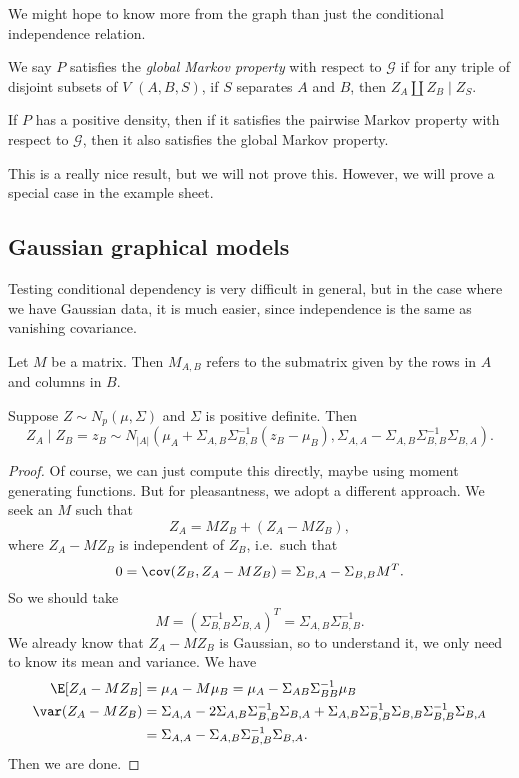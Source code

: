 \documentclass[a4paper]{article}
\begin{document}
We might hope to know more from the graph than just the conditional independence relation.

\begin{defi}
  We say $P$ satisfies the \emph{global Markov property} with respect to $\mathcal{G}$ if for any triple of disjoint subsets of $V$ $(A, B, S)$, if $S$ separates $A$ and $B$, then $Z_A \amalg Z_B \mid Z_S$.
\end{defi}

\begin{prop}
  If $P$ has a positive density, then if it satisfies the pairwise Markov property with respect to $\mathcal{G}$, then it also satisfies the global Markov property.
\end{prop}
This is a really nice result, but we will not prove this. However, we will prove a special case in the example sheet.


\subsection{Gaussian graphical models}
Testing conditional dependency is very difficult in general, but in the case where we have Gaussian data, it is much easier, since independence is the same as vanishing covariance.

\begin{notation}[$M_{A,B}$]
  Let $M$ be a matrix. Then $M_{A,B}$ refers to the submatrix given by the rows in $A$ and columns in $B$.
\end{notation}

\begin{prop}
  Suppose $Z \sim N_p(\mu, \Sigma)$ and $\Sigma$ is positive definite. Then
  \[
    Z_A \mid Z_B = z_B \sim N_{|A|}(\mu_A + \Sigma_{A, B} \Sigma_{B, B}^{-1}(z_B - \mu_B), \Sigma_{A, A} - \Sigma_{A, B} \Sigma_{B, B}^{-1} \Sigma_{B, A}).
  \]
\end{prop}

\begin{proof}
  Of course, we can just compute this directly, maybe using moment generating functions. But for pleasantness, we adopt a different approach. We seek an $M$ such that 
  \[
    Z_A = M Z_B + (Z_A - M Z_B),
  \]
  where $Z_A - M Z_B$ is independent of $Z_B$, i.e.\ such that
  \[
    0 = \cov(Z_B, Z_A - M Z_B) = \Sigma_{B,A} - \Sigma_{B, B} M^T.
  \]
  So we should take
  \[
    M = (\Sigma_{B, B}^{-1}\Sigma_{B,A})^T = \Sigma_{A,B} \Sigma_{B,B}^{-1}.
  \]
  We already know that $Z_A - M Z_B$ is Gaussian, so to understand it, we only need to know its mean and variance. We have
  \begin{align*}
    \E[Z_A - M Z_B ] &= \mu_A - M \mu_B = \mu_A - \Sigma_{AB} \Sigma_{BB}^{-1} \mu_B\\
    \var(Z_A - M Z_B) &= \Sigma_{A, A} - 2 \Sigma_{A, B} \Sigma_{B, B}^{-1} \Sigma_{B, A} + \Sigma_{A, B} \Sigma_{B, B}^{-1} \Sigma_{B, B} \Sigma_{B, B}^{-1} \Sigma_{B, A}\\
    &= \Sigma_{A, A} - \Sigma_{A, B} \Sigma_{B, B}^{-1} \Sigma_{B, A}.
  \end{align*}
  Then we are done.
\end{proof}
\end{document}
